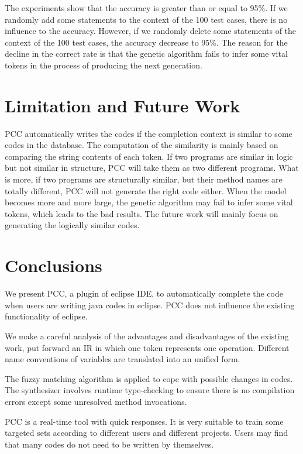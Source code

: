 \documentclass{sig-alternate-05-2015}
\begin{document}
The experiments show that the accuracy is greater than or equal to 95\%. If we randomly add some statements to the context of the 100 test cases, there is no influence to the accuracy. However, if we randomly delete some statements of the context of the 100 test cases, the accuracy decrease to 95\%. The reason for the decline in the correct rate is that the genetic algorithm fails to infer some vital tokens in the process of producing the next generation.

\section{Limitation and Future Work}

PCC automatically writes the codes if the completion context is similar to some codes in the database. The computation of the similarity is mainly based on comparing the string contents of each token. If two programs are similar in logic but not similar in structure, PCC will take them as two different programs. What is more, if two programs are structurally similar, but their method names are totally different, PCC will not generate the right code either. When the model becomes more and more large, the genetic algorithm may fail to infer some vital tokens, which leads to the bad results. The future work will mainly focus on generating the logically similar codes.

\section{Conclusions}

We present PCC, a plugin of eclipse IDE, to automatically complete the code when users are writing java codes in eclipse.
PCC does not influence the existing functionality of eclipse.

We make a careful analysis of the advantages and disadvantages of the existing work, put forward an IR in which one token represents one operation. Different name conventions of variables are translated into an unified form.

The fuzzy matching algorithm is applied to cope with possible changes in codes. The synthesizer involves runtime type-checking to ensure there is no compilation errors except some unresolved method invocations.

PCC is a real-time tool with quick responses. It is very suitable to train some targeted sets according to different users and different projects. Users may find that many codes do not need to be written by themselves.
\end{document}
